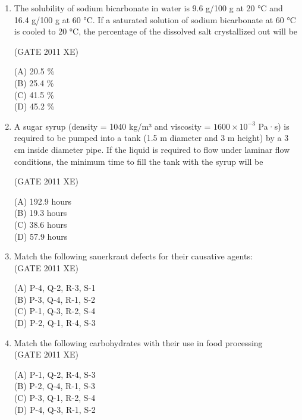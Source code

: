 \documentclass[journal,12pt,onecolumn]{IEEEtran}
\begin{document}
\begin{enumerate}
\item The solubility of sodium bicarbonate in water is 9.6 g/100 g at 20 °C and 16.4 g/100 g at 60 °C. If a saturated solution of sodium bicarbonate at 60 °C is cooled to 20 °C, the percentage of the dissolved salt crystallized out will be

\hfill{(GATE 2011 XE)} \\
\begin{multicols}{4}
(A) 20.5 \% \\
(B) 25.4 \% \\
(C) 41.5 \% \\
(D) 45.2 \%
\end{multicols}

\item A sugar syrup (density = 1040 kg/m³ and viscosity = $1600 \times 10^{-3}$ Pa·s) is required to be pumped into a tank (1.5 m diameter and 3 m height) by a 3 cm inside diameter pipe. If the liquid is required to flow under laminar flow conditions, the minimum time to fill the tank with the syrup will be

\hfill{(GATE 2011 XE)} \\
\begin{multicols}{4}
(A) 192.9 hours \\
(B) 19.3 hours \\
(C) 38.6 hours \\
(D) 57.9 hours
\end{multicols}


\item Match the following sauerkraut defects for their causative agents: \\



\hfill{(GATE 2011 XE)} \\
\begin{multicols}{2}
(A) P-4, Q-2, R-3, S-1 \\
(B) P-3, Q-4, R-1, S-2 \\
(C) P-1, Q-3, R-2, S-4 \\
(D) P-2, Q-1, R-4, S-3
\end{multicols}

\item Match the following carbohydrates with their use in food processing \\




\hfill{(GATE 2011 XE)} \\
\begin{multicols}{2}
(A) P-1, Q-2, R-4, S-3 \\
(B) P-2, Q-4, R-1, S-3 \\
(C) P-3, Q-1, R-2, S-4 \\
(D) P-4, Q-3, R-1, S-2
\end{multicols}


\end{enumerate}
\end{document}

